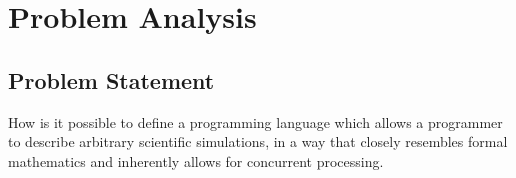 \chapter{Problem Analysis}
\section{Problem Statement}
How is it possible to define a programming language which allows a programmer to describe arbitrary scientific simulations, in a way that closely resembles formal mathematics and inherently allows for concurrent processing.
